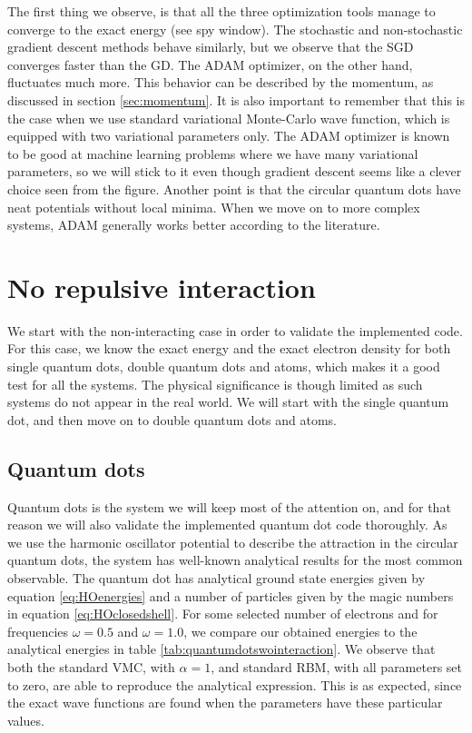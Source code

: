 The first thing we observe, is that all the three optimization tools manage to converge to the exact energy (see spy window). The stochastic and non-stochastic gradient descent methods behave similarly, but we observe that the SGD converges faster than the GD. The ADAM optimizer, on the other hand, fluctuates much more. This behavior can be described by the momentum, as discussed in section \ref{sec:momentum}. It is also important to remember that this is the case when we use standard variational Monte-Carlo wave function, which is equipped with two variational parameters only. The ADAM optimizer is known to be good at machine learning problems where we have many variational parameters, so we will stick to it even though gradient descent seems like a clever choice seen from the figure. Another point is that the circular quantum dots have neat potentials without local minima. When we move on to more complex systems, ADAM generally works better according to the literature. 

\newpage
\section{No repulsive interaction} \label{sec:norepulsive}
We start with the non-interacting case in order to validate the implemented code. For this case, we know the exact energy and the exact electron density for both single quantum dots, double quantum dots and atoms, which makes it a good test for all the systems. The physical significance is though limited as such systems do not appear in the real world. We will start with the single quantum dot, and then move on to double quantum dots and atoms. 

\subsection{Quantum dots}
Quantum dots is the system we will keep most of the attention on, and for that reason we will also validate the implemented quantum dot code thoroughly. As we use the harmonic oscillator potential to describe the attraction in the circular quantum dots, the system has well-known analytical results for the most common observable. The quantum dot has analytical ground state energies given by equation \eqref{eq:HOenergies} and a number of particles given by the magic numbers in equation \eqref{eq:HOclosedshell}. For some selected number of electrons and for frequencies $\omega=0.5$ and $\omega=1.0$, we compare our obtained energies to the analytical energies in table \eqref{tab:quantumdotswointeraction}. We observe that both the standard VMC, with $\alpha=1$, and standard RBM, with all parameters set to zero, are able to reproduce the analytical expression. This is as expected, since the exact wave functions are found when the parameters have these particular values.

